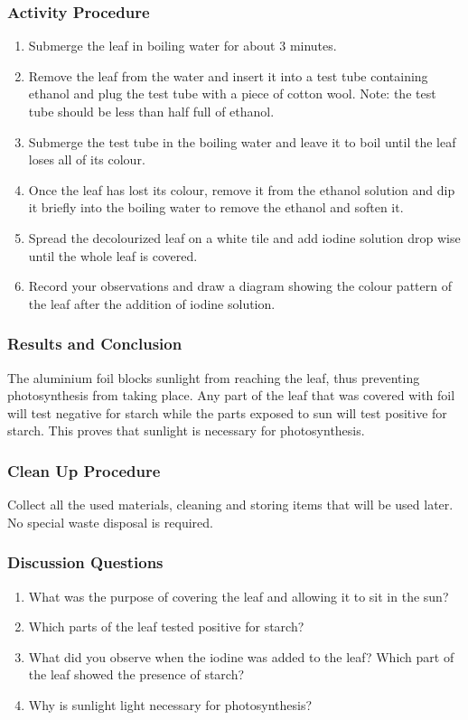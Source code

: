 \subsubsection*{Activity Procedure}
\begin{enumerate}
\item{Submerge the leaf in boiling water for about 3 minutes.}
\item{Remove the leaf from the water and insert it into a test tube containing ethanol and plug the test tube with a piece of cotton wool. Note: the test tube should be less than half full of ethanol.}
\item{Submerge the test tube in the boiling water and leave it to boil until the leaf loses all of its colour.}
\item{Once the leaf has lost its colour, remove it from the ethanol solution and dip it briefly into the boiling water to remove the ethanol and soften it.}
\item{Spread the decolourized leaf on a white tile and add iodine solution drop wise until the whole leaf is covered.}
\item{ Record your observations and draw a diagram showing the colour pattern of the leaf after the addition of iodine solution.}
\end{enumerate}

\subsubsection*{Results and Conclusion}
The aluminium foil blocks sunlight from reaching the leaf, thus preventing photosynthesis from taking place. Any part of the leaf that was covered with foil will test negative for starch while the parts exposed to sun will test positive for starch. This proves that sunlight is necessary for photosynthesis.

\subsubsection*{Clean Up Procedure}
Collect all the used materials, cleaning and storing items that will be used later. No special waste disposal is required.

\subsubsection*{Discussion Questions}
\begin{enumerate}
\item{What was the purpose of covering the leaf and allowing it to sit in the sun?}
\item{Which parts of the leaf tested positive for starch?}
\item{What did you observe when the iodine was added to the leaf? Which part of the leaf showed the presence of starch?}
\item{Why is sunlight light necessary for photosynthesis?}
\end{enumerate}

